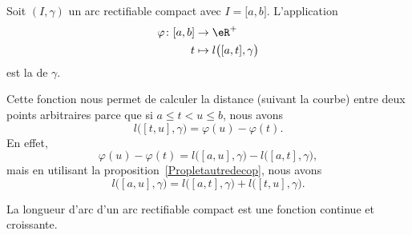 \begin{definition}
	Soit \( (I,\gamma)\) un arc rectifiable compact avec \( I=\mathopen[ a , b \mathclose]\). L'application
	\begin{equation}
		\begin{aligned}
			\varphi\colon \mathopen[ a , b \mathclose] & \to \eR^+                                                \\
			t                                          & \mapsto l\big( \mathopen[ a , t \mathclose],\gamma \big)
		\end{aligned}
	\end{equation}
	est la  de \( \gamma\).
\end{definition}
Cette fonction nous permet de calculer la distance (suivant la courbe) entre deux points arbitraires parce que si \( a\leq t<u\leq b\), nous avons
\begin{equation}
	l\big( [t,u],\gamma \big)=\varphi(u)-\varphi(t).
\end{equation}
En effet,
\begin{equation}
	\varphi(u)-\varphi(t)=l\big( [a,u],\gamma \big)-l\big( [a,t],\gamma \big),
\end{equation}
mais en utilisant la proposition~\ref{Propletautredecop}, nous avons
\begin{equation}
	l\big( [a,u],\gamma \big)=l\big( [a,t],\gamma \big)+l\big( [t,u],\gamma \big).
\end{equation}

\begin{proposition}
	La longueur d'arc d'un arc rectifiable compact est une fonction continue et croissante.
\end{proposition}

